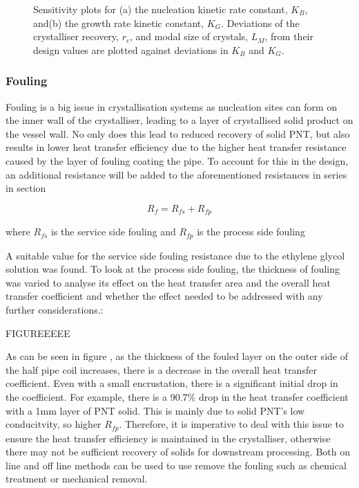 \begin{figure}[h]
    \centering
    
    \caption{Sensitivity plots for (a) the nucleation kinetic rate constant, $K_B$, and(b) the growth rate kinetic constant, $K_G$. Deviations of the crystalliser recovery, $r_c$, and modal size of crystals, $L_M$, from their design values are plotted against deviations in $K_B$ and $K_G$. }
    \label{fig:sensitivity kinetics}
\end{figure}
   
\subsubsection{Fouling}\label{sec:fouling}

Fouling is a big issue in crystallisation systems as nucleation sites can form on the inner wall of the crystalliser, leading to a layer of crystallised solid product on the vessel wall. No only does this lead to reduced recovery of solid PNT, but also results in lower heat transfer efficiency due to the higher heat transfer resistance caused by the layer of fouling coating the pipe. To account for this in the  design, an additional resistance will be added to the aforementioned resistances in series in section %


\begin{equation} \label{eq:fouling}
    R_f = R_{fs} + R_{fp}
    \end{equation}
    
    where $R_{fs}$ is the service side fouling and $R_{fp}$ is the process side fouling 

A suitable value for the service side fouling resistance due to the ethylene glycol solution was found. To look at the process side fouling, the thickness of fouling was varied to analyse its effect on the heat transfer area and the overall heat transfer coefficient and whether the effect needed to be addressed with any further considerations.:

FIGUREEEEE

As can be seen in figure 
, as the thickness of the fouled layer on the outer side of the half pipe coil increases, there is a decrease in the overall heat transfer coefficient. Even with a small encrustation, there is a significant initial drop in the coefficient. For example, there is a 90.7\% drop in the heat transfer coefficient with a 1mm layer of PNT solid. This is mainly due to solid PNT's low conducitvity, so higher $R_{fp}$. Therefore, it is imperative to deal with this issue to ensure the heat transfer efficiency is maintained in the crystalliser, otherwise there may not be sufficient recovery of solids for downstream processing. Both on line and off line methods can be used to use remove the fouling such as chemical treatment or mechanical removal. 




